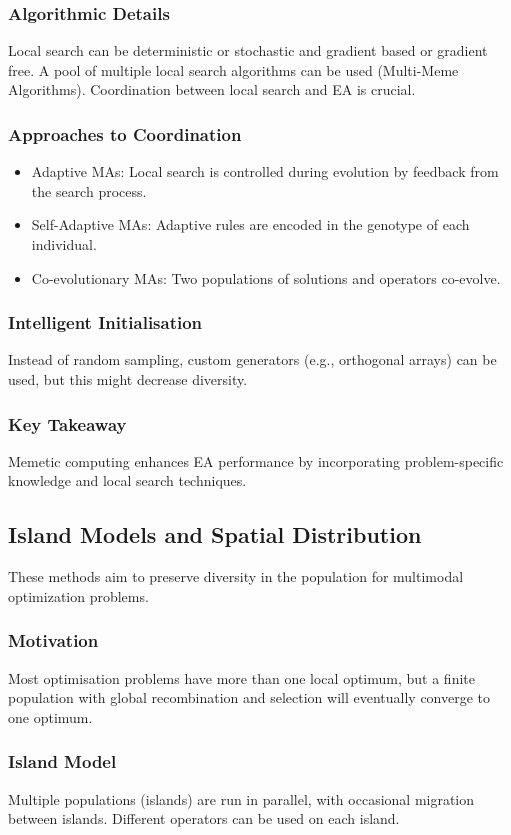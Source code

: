 \subsubsection*{Algorithmic Details}
Local search can be deterministic or stochastic and gradient based or gradient free. A pool of multiple local search algorithms can be used (Multi-Meme Algorithms). Coordination between local search and EA is crucial.
\subsubsection*{Approaches to Coordination}
\begin{itemize}
    \item  Adaptive MAs: Local search is controlled during evolution by feedback from the search process.
     \item Self-Adaptive MAs: Adaptive rules are encoded in the genotype of each individual.
    \item Co-evolutionary MAs: Two populations of solutions and operators co-evolve.
\end{itemize}
\subsubsection*{Intelligent Initialisation}
Instead of random sampling, custom generators (e.g., orthogonal arrays) can be used, but this might decrease diversity.
\subsubsection*{Key Takeaway}
Memetic computing enhances EA performance by incorporating problem-specific knowledge and local search techniques.

\subsection*{Island Models and Spatial Distribution}
These methods aim to preserve diversity in the population for multimodal optimization problems.
\subsubsection*{Motivation}
Most optimisation problems have more than one local optimum, but a finite population with global recombination and selection will eventually converge to one optimum.
\subsubsection*{Island Model}
Multiple populations (islands) are run in parallel, with occasional migration between islands. Different operators can be used on each island.
